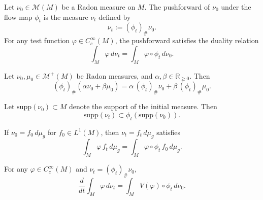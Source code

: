 \begin{definition}
Let $\nu_0 \in \mathcal{M}(M)$ be a Radon measure on $M$. The pushforward of $\nu_0$ under the flow map $\phi_t$ is the measure $\nu_t$ defined by
\begin{equation}
\label{eq:pushforward_def}
\nu_t := (\phi_t)_\# \nu_0.
\end{equation}
For any test function $\varphi \in C_c^\infty(M)$, the pushforward satisfies the duality relation
\begin{equation}
\label{eq:pushforward_identity}
\int_M \varphi \, d\nu_t = \int_M \varphi \circ \phi_t \, d\nu_0.
\end{equation}
\end{definition}

\begin{lemma}
Let $\nu_0, \mu_0 \in \mathcal{M}^+(M)$ be Radon measures, and $\alpha, \beta \in \mathbb{R}_{\geq 0}$. Then
\begin{equation}
(\phi_t)_\#(\alpha \nu_0 + \beta \mu_0) = \alpha \, (\phi_t)_\#\nu_0 + \beta \, (\phi_t)_\#\mu_0.
\end{equation}
\end{lemma}

\begin{lemma}
Let $\mathrm{supp}(\nu_0) \subset M$ denote the support of the initial measure. Then
\begin{equation}
\mathrm{supp}(\nu_t) \subset \phi_t(\mathrm{supp}(\nu_0)).
\end{equation}
\end{lemma}

\begin{example}
If $\nu_0 = f_0 \, d\mu_g$ for $f_0 \in L^1(M)$, then $\nu_t = f_t \, d\mu_g$ satisfies
\begin{equation}
\int_M \varphi \, f_t \, d\mu_g = \int_M \varphi \circ \phi_t \, f_0 \, d\mu_g.
\end{equation}
\end{example}

\begin{corollary}
For any $\varphi \in C_c^\infty(M)$ and $\nu_t = (\phi_t)_\# \nu_0$,
\begin{equation}
\frac{d}{dt} \int_M \varphi \, d\nu_t = \int_M V(\varphi) \circ \phi_t \, d\nu_0.
\end{equation}
\end{corollary}


